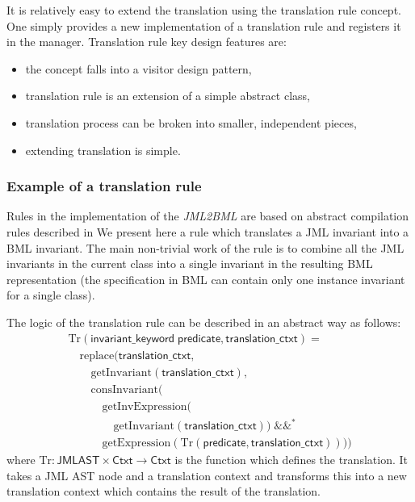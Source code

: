 \documentclass{llncs}
\newcommand{\jmltobmltext}{JML2BML}
\newcommand{\jmltobml}{\textsl{\jmltobmltext}\xspace}
\begin{document}
It is relatively easy to extend the translation using the translation rule
concept. One simply provides a new implementation of a translation rule and registers it in the manager.
Translation rule key design features are:
\begin{itemize}
\item the concept falls into a visitor design pattern,
\item translation rule is an extension of a simple abstract class,
\item translation process can be broken into smaller, independent pieces,
\item extending translation is simple.
\end{itemize}

\subsubsection{Example of a translation rule}

\newcommand{\Tr}{\mathrm{Tr}\xspace}
\newcommand{\invariantkeyword}{\mathsf{invariant\_keyword}\xspace}
\newcommand{\predicate}{\mathsf{predicate}\xspace}
\newcommand{\translationcontext}{\mathsf{translation\_ctxt}\xspace}
\newcommand{\JAST}{\mathsf{JMLAST}\xspace}
\newcommand{\TContext}{\mathsf{Ctxt}\xspace}
\newcommand{\replace}{\mathrm{replace}\xspace}
\newcommand{\getInvariant}{\mathrm{getInvariant}\xspace}
\newcommand{\getInvExpression}{\mathrm{getInvExpression}\xspace}
\newcommand{\getExpression}{\mathrm{getExpression}\xspace}
\newcommand{\packInvariant}{\mathrm{consInvariant}\xspace}
Rules in the implementation of the \jmltobml are based on abstract compilation
rules described in \cite[Chap.9]{bmlrefman}
We present here a rule which translates a JML invariant into a BML
invariant. The main non-trivial work of the rule is to combine all the
JML invariants in the current class into a single invariant in the
resulting BML representation (the specification in BML can contain
only one instance invariant for a single class).

The logic of the translation rule can be described in an abstract way
as follows:
\begin{displaymath}
\begin{array}{l}
\Tr(\invariantkeyword\; \predicate, \translationcontext) =\\
\quad    \replace(\translationcontext, \\
\quad\quad   \getInvariant(\translationcontext),\\
\quad\quad   \packInvariant(\\
\quad\quad\quad   \getInvExpression(\\
\quad\quad\quad\quad \getInvariant(\translationcontext))\;\&\&^*\\
\quad\quad\quad   \getExpression(\Tr(\predicate, \translationcontext ))))
\end{array}
\end{displaymath}
where $\Tr : \JAST \times \TContext\to \TContext$ is the function
which defines the translation. It takes a JML AST node and a
translation context and transforms this into a new translation context
which contains the result of the translation.
\end{document}
